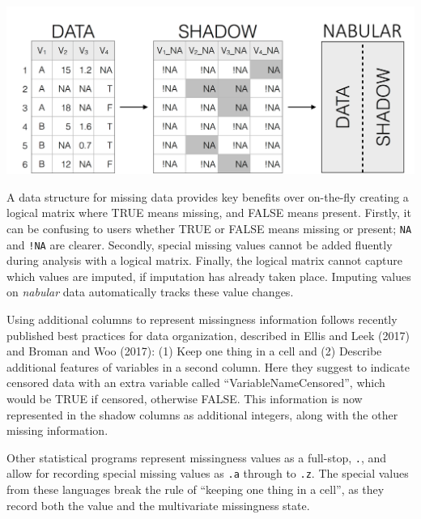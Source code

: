 \documentclass[]{article}
\let\origfigure\figure
\let\endorigfigure\endfigure
\renewenvironment{figure}[1][2] {
    \expandafter\origfigure\expandafter[H]
} {
    \endorigfigure
}
\theoremstyle{definition}
\theoremstyle{definition}
\theoremstyle{definition}
\theoremstyle{remark}
\begin{document}
\begin{figure}

{\centering \includegraphics[width=1\linewidth]{nabular} 

}

\caption{The process of creating nabular data. Data transformed to shadow matrix, and nabular data contains the shadow matrix, column bound to the data. Nabular data can be created using `bind\_shadow` or `nabular()` functions. Nabular data provides a useful format for missing data exploration and analysis.}\label{fig:nabularfig}
\end{figure}

A data structure for missing data provides key benefits over on-the-fly
creating a logical matrix where TRUE means missing, and FALSE means
present. Firstly, it can be confusing to users whether TRUE or FALSE
means missing or present; \texttt{NA} and \texttt{!NA} are clearer.
Secondly, special missing values cannot be added fluently during
analysis with a logical matrix. Finally, the logical matrix cannot
capture which values are imputed, if imputation has already taken place.
Imputing values on \emph{nabular} data automatically tracks these value
changes.

Using additional columns to represent missingness information follows
recently published best practices for data organization, described in
Ellis and Leek (2017) and Broman and Woo (2017): (1) Keep one thing in a
cell and (2) Describe additional features of variables in a second
column. Here they suggest to indicate censored data with an extra
variable called ``VariableNameCensored'', which would be TRUE if
censored, otherwise FALSE. This information is now represented in the
shadow columns as additional integers, along with the other missing
information.

Other statistical programs represent missingness values as a full-stop,
\texttt{.}, and allow for recording special missing values as
\texttt{.a} through to \texttt{.z}. The special values from these
languages break the rule of ``keeping one thing in a cell'', as they
record both the value and the multivariate missingness state.
\end{document}
